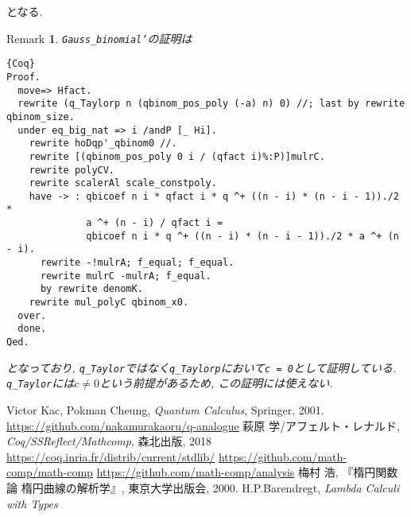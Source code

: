 \documentclass[11pt]{jarticle}
\theoremstyle{mystyle}
\newtheorem{rmk}[df]{$\textrm{Remark}$}
\newcommand{\brmk}{\begin{rmk}}
\newcommand{\ermk}{\end{rmk}}
\newcommand{\0}{\textbf{0}}
\newcommand{\1}{\textbf{1}}
\newcommand{\2}{\textbf{2}}
\begin{document}
となる. 
\brmk
{\tt Gauss\_binomial'}の証明は
\begin{lstlisting}{Coq}
Proof.
  move=> Hfact.
  rewrite (q_Taylorp n (qbinom_pos_poly (-a) n) 0) //; last by rewrite qbinom_size.
  under eq_big_nat => i /andP [_ Hi].
    rewrite hoDqp'_qbinom0 //.
    rewrite [(qbinom_pos_poly 0 i / (qfact i)%:P)]mulrC.
    rewrite polyCV.
    rewrite scalerAl scale_constpoly.
    have -> : qbicoef n i * qfact i * q ^+ ((n - i) * (n - i - 1))./2 *
              a ^+ (n - i) / qfact i =
              qbicoef n i * q ^+ ((n - i) * (n - i - 1))./2 * a ^+ (n - i).
      rewrite -!mulrA; f_equal; f_equal.
      rewrite mulrC -mulrA; f_equal.
      by rewrite denomK.
    rewrite mul_polyC qbinom_x0.
  over.
  done.
Qed. \end{lstlisting}
となっており, {\tt q\_Taylor}ではなく{\tt q\_Taylorp}において{\tt c = 0}として証明している. 
{\tt q\_Taylor}には$c \neq 0$という前提があるため, この証明には使えない. 
\ermk
\begin{thebibliography}{9}
   Victor Kac, Pokman Cheung, {\it{Quantum Calculus}}, Springer, 2001.
   \url{https://github.com/nakamurakaoru/q-analogue}
   萩原 学/アフェルト・レナルド, {\it Coq/SSReflect/Mathcomp}, 森北出版, 
    2018
   \url{https://coq.inria.fr/distrib/current/stdlib/}
   \url{https://github.com/math-comp/math-comp}
   \url{https://github.com/math-comp/analysis}
   梅村 浩, 『楕円関数論  楕円曲線の解析学』, 東京大学出版会, 2000.
   H.P.Barendregt, {\it{Lambda Calculi with Types}}
\end{thebibliography}
\end{document}
